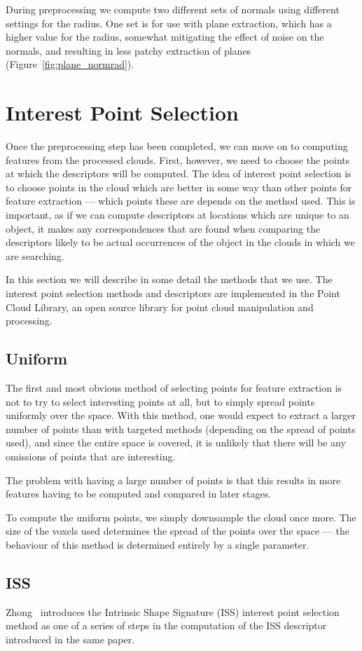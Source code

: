 \documentclass[11pt,a4paper]{kth-mag}
\begin{document}
During preprocessing we compute two different sets of normals using different
settings for the radius. One set is for use with plane extraction, which has a
higher value for the radius, somewhat mitigating the effect of noise on the
normals, and resulting in less patchy extraction of planes
(Figure~\ref{fig:plane_normrad}).
\chapter{Interest Point Selection}
\label{chap:interest}
Once the preprocessing step has been completed, we can move on to computing
features from the processed clouds. First, however, we need to choose the points
at which the descriptors will be computed. The idea of interest point selection
is to choose points in the cloud which are better in some way than other points
for feature extraction --- which points these are depends on the method used.
This is important, as if we can compute descriptors at locations which are
unique to an object, it makes any correspondences that are found when comparing
the descriptors likely to be actual occurrences of the object in the clouds in
which we are searching.

In this section we will describe in some detail the methods that we use. The
interest point selection methods and descriptors are implemented in the Point
Cloud Library\cite{pcl}, an open source library for point cloud manipulation and
processing.

\section{Uniform}
The first and most obvious method of selecting points for feature extraction is
not to try to select interesting points at all, but to simply spread points
uniformly over the space. With this method, one would expect to extract a larger
number of points than with targeted methods (depending on the spread of points
used), and since the entire space is covered, it is unlikely that there will be
any omissions of points that are interesting.

The problem with having a large number of points is that this results in more
features having to be computed and compared in later stages.

To compute the uniform points, we simply downsample the cloud once more. The
size of the voxels used determines the spread of the points over the space ---
the behaviour of this method is determined entirely by a single parameter.
\section{ISS}
Zhong~\cite{zhong2009intrinsic} introduces the Intrinsic Shape Signature (ISS)
interest point selection method as one of a series of steps in the computation
of the ISS descriptor introduced in the same paper.
\end{document}
